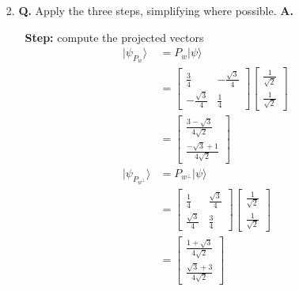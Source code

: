 \documentclass[main.tex]{subfiles}
\begin{document}
\begin{enumerate}
\begin{enumerate}
        \item[2.] \textbf{Q.} Apply the three steps, simplifying where possible. \textbf{A.}
        \begin{enumerate}
            \item [] \textbf{Step:} compute the projected vectors
                \begin{align*}
                    |\psi_{P_{w}}\rangle            & = P_{w} | \psi \rangle \\
                                                    & = \left[\begin{array}{ll} \frac{3}{4} & -\frac{\sqrt{3}}{4} \\ 
                                                    -\frac{\sqrt{3}}{4} & \frac{1}{4}\end{array} \right]
                                                    \left[\begin{array}{l} \frac{1}{\sqrt{2}} \\ \frac{1}{\sqrt{2}} \end{array} \right]\\
                                                    & = \left[\begin{array}{l} \frac{3-\sqrt{3}}{4\sqrt{2}} \\  
                                                    \frac{-\sqrt{3}+1}{4\sqrt{2}}\end{array}\right]\\
                    |\psi_{P_{w^{\perp}}}\rangle    & = P_{w^{\perp}} | \psi \rangle \\
                                                    & = \left[\begin{array}{ll} \frac{1}{4} & \frac{\sqrt{3}}{4} \\ 
                                                    \frac{\sqrt{3}}{4} & \frac{3}{4}\end{array} \right]
                                                    \left[\begin{array}{l} \frac{1}{\sqrt{2}} \\ \frac{1}{\sqrt{2}} \end{array} \right]\\
                                                    & = \left[\begin{array}{l} \frac{1+\sqrt{3}}{4\sqrt{2}} \\
                                                    \frac{\sqrt{3}+3}{4\sqrt{2}}\end{array}\right]\\

\end{align*}
\end{enumerate}
\end{enumerate}
\end{enumerate}
\end{document}
